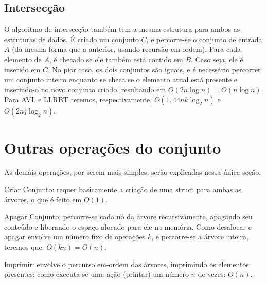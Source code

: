 \documentclass{article}
\begin{document}
\subsection{Intersecção}
O algoritmo de intersecção também tem a mesma estrutura para ambos as estruturas de dados. É criado um conjunto $C$, e percorre-se
o conjunto de entrada $A$ (da mesma forma que a anterior, usando recursão em-ordem). Para cada elemento de $A$, é checado se ele
também está contido em $B$. Caso seja, ele é inserido em $C$.
No pior caso, os dois conjuntos são iguais, e é necessário percorrer um conjunto inteiro enquanto se checa se o elemento atual está
presente e inserindo-o no novo conjunto criado, resultando em $O(2n\log n) = O(n\log n)$. Para AVL e LLRBT teremos, respectivamente,
$O(1,44 nk \log_2 n)$ e $O(2 nj \log_2 n)$.

\section{Outras operações do conjunto}
As demais operações, por serem mais simples, serão explicadas nessa única seção.

Criar Conjunto: requer basicamente a criação de uma struct para ambas as árvores, o que é feito em $O(1)$.

Apagar Conjunto: percorre-se cada nó da árvore recursivamente, apagando seu conteúdo e liberando o espaço alocado para ele na 
memória. Como desalocar e apagar envolve um número fixo de operações $k$, e percorre-se a árvore inteira, teremos que: $O(kn) = O(n)$.

Imprimir: envolve o percurso em-ordem das árvores, imprimindo os elementos presentes; como executa-se uma ação (printar)
um número $n$ de vezes: $O(n)$.
\end{document}
